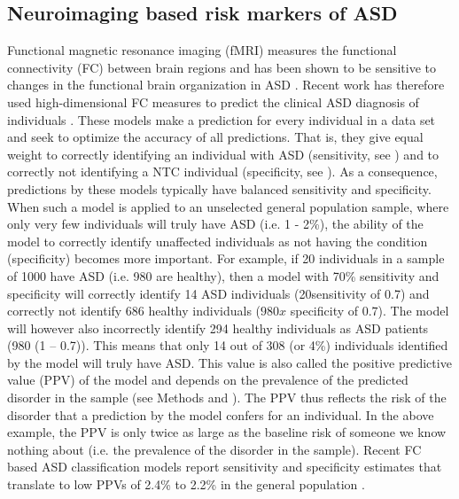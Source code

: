 \documentclass[9pt,lineno]{elife}
\begin{document}
\subsection{Neuroimaging based risk markers of ASD}
Functional magnetic resonance imaging (fMRI) measures the functional connectivity (FC) between brain regions and has been shown to be sensitive to changes in the functional brain organization in ASD \citep{Castellanos2013-tw,Holiga2019-ub}. Recent work has therefore used high-dimensional FC measures to predict the clinical ASD diagnosis of individuals \citep{Abraham2017-vf,Heinsfeld2018-yl,Yahata2016-jk}. These models make a prediction for every individual in a data set and seek to optimize the accuracy of all predictions. That is, they give equal weight to correctly identifying an individual with ASD (sensitivity, see ) and to correctly not identifying a NTC individual (specificity, see ). As a consequence, predictions by these models typically have balanced sensitivity and specificity. When such a model is applied to an unselected general population sample, where only very few individuals will truly have ASD (i.e. 1 - 2\%), the ability of the model to correctly identify unaffected individuals as not having the condition (specificity) becomes more important. For example, if 20 individuals in a sample of 1000 have ASD (i.e. 980 are healthy), then a model with 70\% sensitivity and specificity will correctly identify 14 ASD individuals (20sensitivity of 0.7) and correctly not identify 686 healthy individuals ($980 x $ specificity of $0.7$). The model will however also incorrectly identify 294 healthy individuals as ASD patients (980 (1 – 0.7)). This means that only 14 out of 308 (or 4\%) individuals identified by the model will truly have ASD. This value is also called the positive predictive value (PPV) of the model and depends on the prevalence of the predicted disorder in the sample (see Methods and ). The PPV thus reflects the risk of the disorder that a prediction by the model confers for an individual. In the above example, the PPV is only twice as large as the baseline risk of someone we know nothing about (i.e. the prevalence of the disorder in the sample). Recent FC based ASD classification models report sensitivity and specificity estimates that translate to low PPVs of 2.4\% to 2.2\% in the general population \citep{Abraham2017-vf,Heinsfeld2018-yl}.
\end{document}
